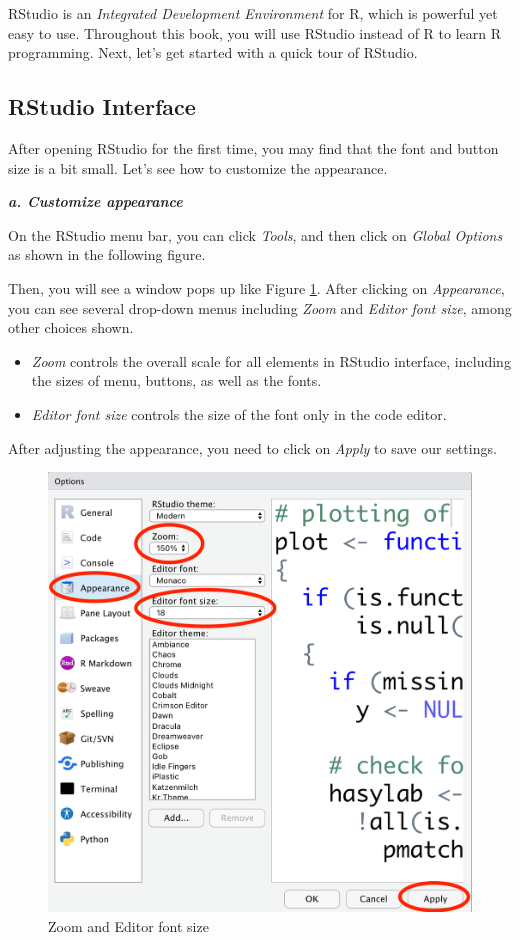 \documentclass[
]{book}
\begin{document}
RStudio is an \emph{Integrated Development Environment} for R, which is powerful yet easy to use. Throughout this book, you will use RStudio instead of R to learn R programming. Next, let's get started with a quick tour of RStudio.

\hypertarget{rstudio-interface}{%
\subsection{RStudio Interface}\label{rstudio-interface}}

After opening RStudio for the first time, you may find that the font and button size is a bit small. Let's see how to customize the appearance.

\textbf{\emph{a. Customize appearance}}

On the RStudio menu bar, you can click \emph{Tools}, and then click on \emph{Global Options} as shown in the following figure.

Then, you will see a window pops up like Figure \ref{fig:size}. After clicking on \emph{Appearance}, you can see several drop-down menus including \emph{Zoom} and \emph{Editor font size}, among other choices shown.

\begin{itemize}
\item
  \emph{Zoom} controls the overall scale for all elements in RStudio interface, including the sizes of menu, buttons, as well as the fonts.
\item
  \emph{Editor font size} controls the size of the font only in the code editor.
\end{itemize}

After adjusting the appearance, you need to click on \emph{Apply} to save our settings.

\begin{figure}

{\centering \includegraphics[width=0.5\linewidth]{pics/1size} 

}

\caption{Zoom and Editor font size}\label{fig:size}
\end{figure}
\end{document}
